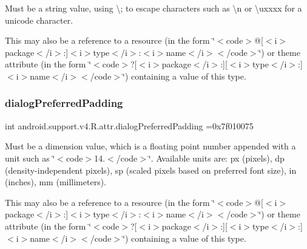 Must be a string value, using \textquotesingle{}\textbackslash{};\textquotesingle{} to escape characters such as \textquotesingle{}\textbackslash{}n\textquotesingle{} or \textquotesingle{}\textbackslash{}uxxxx\textquotesingle{} for a unicode character. 

This may also be a reference to a resource (in the form \char`\"{}$<$code$>$@\mbox{[}$<$i$>$package$<$/i$>$\+:\mbox{]}$<$i$>$type$<$/i$>$\+:$<$i$>$name$<$/i$>$$<$/code$>$\char`\"{}) or theme attribute (in the form \char`\"{}$<$code$>$?\mbox{[}$<$i$>$package$<$/i$>$\+:\mbox{]}\mbox{[}$<$i$>$type$<$/i$>$\+:\mbox{]}$<$i$>$name$<$/i$>$$<$/code$>$\char`\"{}) containing a value of this type. \mbox{\label{classandroid_1_1support_1_1v4_1_1R_1_1attr_a2c1ecb946d64692496cf48a36058b2fb}} 
\subsubsection{\texorpdfstring{dialog\+Preferred\+Padding}{dialogPreferredPadding}}
{\footnotesize\ttfamily int android.\+support.\+v4.\+R.\+attr.\+dialog\+Preferred\+Padding =0x7f010075\hspace{0.3cm}{\ttfamily [static]}}

Must be a dimension value, which is a floating point number appended with a unit such as \char`\"{}$<$code$>$14.\+5sp$<$/code$>$\char`\"{}. Available units are\+: px (pixels), dp (density-\/independent pixels), sp (scaled pixels based on preferred font size), in (inches), mm (millimeters). 

This may also be a reference to a resource (in the form \char`\"{}$<$code$>$@\mbox{[}$<$i$>$package$<$/i$>$\+:\mbox{]}$<$i$>$type$<$/i$>$\+:$<$i$>$name$<$/i$>$$<$/code$>$\char`\"{}) or theme attribute (in the form \char`\"{}$<$code$>$?\mbox{[}$<$i$>$package$<$/i$>$\+:\mbox{]}\mbox{[}$<$i$>$type$<$/i$>$\+:\mbox{]}$<$i$>$name$<$/i$>$$<$/code$>$\char`\"{}) containing a value of this type. \mbox{\label{classandroid_1_1support_1_1v4_1_1R_1_1attr_a2a06f7a8c2e9e8a194ded551b48c858b}} 
